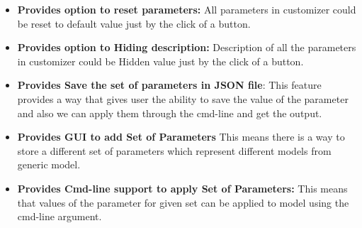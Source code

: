 \begin{itemize}
    \item \textbf{Provides option to reset parameters:}
    All parameters in customizer could be reset to default value just by the click of a button.

    \item \textbf{Provides option to Hiding description:}
    Description of all the parameters in customizer could be Hidden value just by the click of a button.
   
    \item \textbf{Provides Save the set of parameters in JSON file}:
    This feature provides a way that gives user the ability to save the value of the parameter and also we can apply them through the cmd-line and get the output.
   
    \item \textbf{Provides GUI to add Set of Parameters}
    This means there is a way to store a different set of parameters which represent different models from generic model.
   
    \item \textbf{Provides Cmd-line support to apply Set of Parameters:}
    This means that values of the parameter for given set can be applied to model using the cmd-line argument.
   
     
\end{itemize}

